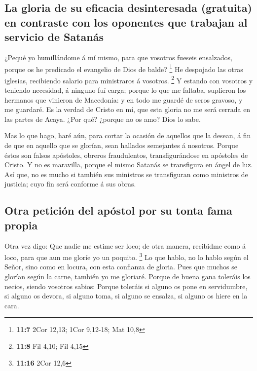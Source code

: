 \hypertarget{la-gloria-de-su-eficacia-desinteresada-gratuita-en-contraste-con-los-oponentes-que-trabajan-al-servicio-de-satanuxe1s}{%
\subsection{La gloria de su eficacia desinteresada (gratuita) en
contraste con los oponentes que trabajan al servicio de
Satanás}\label{la-gloria-de-su-eficacia-desinteresada-gratuita-en-contraste-con-los-oponentes-que-trabajan-al-servicio-de-satanuxe1s}}

 ¿Pequé yo humillándome á mí mismo, para que vosotros
fueseis ensalzados, porque os he predicado el evangelio de Dios de
balde? \footnote{\textbf{11:7} 2Cor 12,13; 1Cor 9,12-18; Mat 10,8}
 He despojado las otras iglesias, recibiendo salario para
ministraros á vosotros. \footnote{\textbf{11:8} Fil 4,10; Fil 4,15}
 Y estando con vosotros y teniendo necesidad, á ninguno
fuí carga; porque lo que me faltaba, suplieron los hermanos que vinieron
de Macedonia: y en todo me guardé de seros gravoso, y me guardaré.
 Es la verdad de Cristo en mí, que esta gloria no me será
cerrada en las partes de Acaya.  ¿Por qué? ¿porque no os
amo? Dios lo sabe.

 Mas lo que hago, haré aún, para cortar la ocasión de
aquellos que la desean, á fin de que en aquello que se glorían, sean
hallados semejantes á nosotros.  Porque éstos son falsos
apóstoles, obreros fraudulentos, transfigurándose en apóstoles de
Cristo.  Y no es maravilla, porque el mismo Satanás se
transfigura en ángel de luz.  Así que, no es mucho si
también sus ministros se transfiguran como ministros de justicia; cuyo
fin será conforme á sus obras.

\hypertarget{otra-peticiuxf3n-del-apuxf3stol-por-su-tonta-fama-propia}{%
\subsection{Otra petición del apóstol por su tonta fama
propia}\label{otra-peticiuxf3n-del-apuxf3stol-por-su-tonta-fama-propia}}

 Otra vez digo: Que nadie me estime ser loco; de otra
manera, recibidme como á loco, para que aun me gloríe yo un poquito.
\footnote{\textbf{11:16} 2Cor 12,6}  Lo que hablo, no lo
hablo según el Señor, sino como en locura, con esta confianza de gloria.
 Pues que muchos se glorían según la carne, también yo me
gloriaré.  Porque de buena gana toleráis los necios,
siendo vosotros sabios:  Porque toleráis si alguno os
pone en servidumbre, si alguno os devora, si alguno toma, si alguno se
ensalza, si alguno os hiere en la cara.

